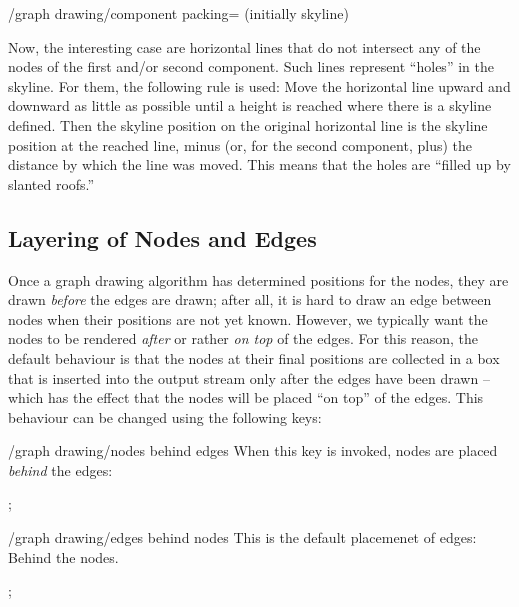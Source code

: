 \begin{key}{/graph drawing/component packing= (initially
    skyline)}
\begin{itemize}
    Now, the interesting case are horizontal lines that do not
    intersect any of the nodes of the first and/or second
    component. Such lines represent ``holes'' in the skyline. For
    them, the following rule is used: Move the horizontal line upward
    and downward as little as possible until a height is reached where
    there is a skyline defined. Then the skyline position on the
    original horizontal line is the skyline position at the reached
    line, minus (or, for the second component, plus) the distance by
    which the line was moved. This means that the holes are ``filled
    up by slanted roofs.''
\begin{codeexample}[]
\end{codeexample}

\end{itemize}
\end{key}



\subsection{Layering of Nodes and Edges}

Once a graph drawing algorithm has determined positions for the nodes,
they are drawn \emph{before} the edges are drawn; after
all, it is hard to draw an edge between nodes when their positions
are not yet known. However, we typically want the nodes to be
rendered \emph{after} or rather \emph{on top} of the edges. For
this reason, the default behaviour is that the nodes at their
final positions are collected in a box that is inserted into the
output stream only after the edges have been drawn -- which has
the effect that the nodes will be placed ``on top'' of the
edges. This behaviour can be changed using the following keys:

\begin{key}{/graph drawing/nodes behind edges}
  When this key is invoked, nodes are placed \emph{behind} the edges:
\begin{codeexample}[]
\tikz {};    
\end{codeexample}
\end{key}
\begin{key}{/graph drawing/edges behind nodes}
  This is the default placemenet of edges: Behind the nodes.
\begin{codeexample}[]
\tikz {};    
\end{codeexample}
\end{key}



\endinput

